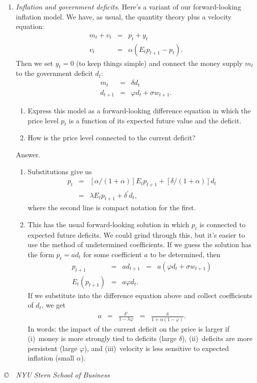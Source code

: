\documentclass[11pt]{article}
\begin{document}
\begin{enumerate}
\item  {\it Inflation and government deficits.\/}
Here's a variant of our forward-looking inflation model.
We have, as usual, the quantity theory plus a velocity equation:
\begin{eqnarray*}
    m_t + v_t &=& p_t + y_t \\
    v_t &=& \alpha \left( E_t p_{t+1} - p_t \right) .
\end{eqnarray*}
Then we set $y_t = 0$ (to keep things simple) and connect the money supply $m_t$
to the government deficit $d_t$:
\begin{eqnarray*}
        m_{t} &=& \delta d_t \\
        d_{t+1} &=& \varphi d_t + \sigma w_{t+1} .
\end{eqnarray*}
%
\begin{enumerate}
\item Express this model as a forward-looking difference equation in
which the price level $p_t$ is a function of its expected future value
and the deficit.
\item How is the price level connected to the current deficit?
\end{enumerate}
%
Answer.
\begin{enumerate}
\item Substitutions give us
\begin{eqnarray*}
    p_t &=& [\alpha/(1+\alpha)] E_t p_{t+1} + [\delta/(1+\alpha)] d_t \\
        &=& \lambda E_t p_{t+1} + \delta^\prime d_t ,
\end{eqnarray*}
where the second line is compact notation for the first.
\item This has the usual forward-looking solution in which $p_t$
is connected to expected future deficits.
We could grind through this, but it's easier to use the method of undetermined
coefficients.
If we guess the solution has the form $ p_t = a d_t$ for some coefficient $a$ to be determined,
then
\begin{eqnarray*}
    p_{t+1} &=& a d_{t+1} \;\;=\;\; a (\varphi d_t + \sigma w_{t+1}) \\
   E_t (  p_{t+1})  &=&  a \varphi d_t .
\end{eqnarray*}
If we substitute into the difference equation above and collect coefficients
of $d_t$, we get
\begin{eqnarray*}
    a &=& \frac{\delta'}{1-\lambda \varphi}  \;\;=\;\; \frac{\delta}{1+\alpha(1-\varphi)} .
\end{eqnarray*}
In words:  the impact of the current deficit on the price is larger if
(i)~money is more strongly tied to deficits (large $\delta$),
(ii)~deficits are more persistent (large $\varphi$),
and (iii)~velocity is less sensitive to expected inflation (small $\alpha$).
\end{enumerate}


\end{enumerate}


\vfill \centerline{\it \copyright \ \number\year \ NYU Stern School of Business}
\end{document}
